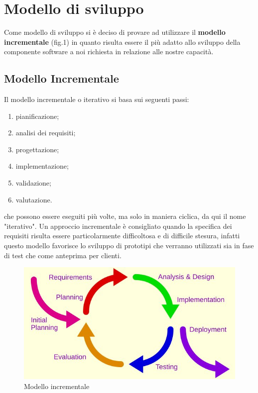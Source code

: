 \section{Modello di sviluppo}
	Come modello di sviluppo si è deciso di provare ad utilizzare il \textbf{modello incrementale} (fig.1) in quanto risulta essere il più adatto allo sviluppo della componente software a noi richiesta in relazione alle nostre capacità. 
	
	\subsection{Modello Incrementale}
		Il modello incrementale o iterativo si basa sui seguenti passi:
		\begin{enumerate}
			\item pianificazione;
			\item analisi dei requisiti\pedice;
			\item progettazione;
			\item implementazione;
			\item validazione;
			\item valutazione.
		\end{enumerate}
		che possono essere eseguiti più volte, ma solo in maniera ciclica, da qui il nome "iterativo". Un approccio incrementale è consigliato quando la specifica dei requisiti risulta essere particolarmente difficoltosa e di difficile stesura, infatti questo modello favorisce lo sviluppo di prototipi che verranno utilizzati sia in fase di test che come anteprima per clienti.

		\begin{figure}[!htpb]
			\centering
		    \includegraphics[scale= 0.9]{Iterative_development_model.jpg}
			\caption{Modello incrementale}
		\end{figure}
